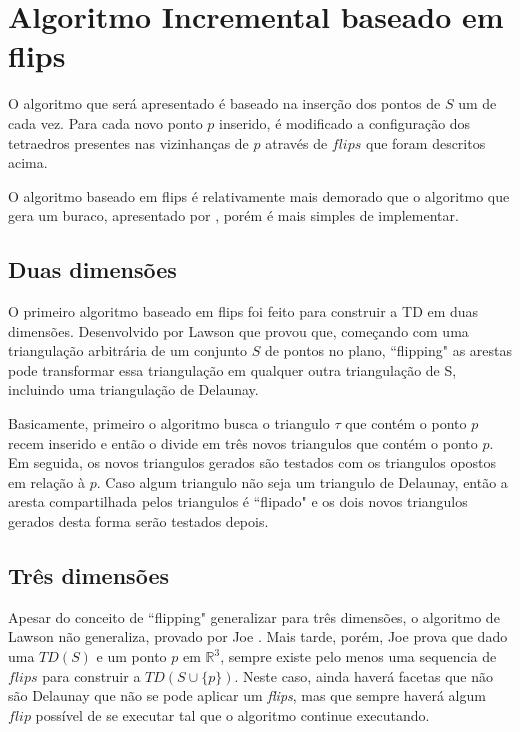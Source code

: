 

\section{Algoritmo Incremental baseado em flips}

O algoritmo que será apresentado é baseado na inserção dos pontos de $S$ um de cada vez.
Para cada novo ponto $p$ inserido, é modificado a configuração dos tetraedros presentes nas vizinhanças 
de $p$ através de $flips$ que foram descritos acima. 

O algoritmo baseado em flips é relativamente mais demorado que o algoritmo que 
gera um buraco, apresentado por \cite{Engwirda2015}, porém é mais simples de implementar.

\subsection{Duas dimensões}

O primeiro algoritmo baseado em flips foi feito para construir a TD em duas dimensões.
Desenvolvido por Lawson \cite{Lawson1977} que provou que, começando com uma 
triangulação arbitrária de um conjunto $S$ de pontos no plano, ``flipping" 
as arestas pode transformar essa triangulação em qualquer outra triangulação de S,
incluindo uma triangulação de Delaunay. 

Basicamente, primeiro o algoritmo busca o triangulo $\tau$ que contém o ponto
$p$ recem inserido e então o divide em três novos triangulos que contém o 
ponto $p$. Em seguida, os novos triangulos gerados são testados com os triangulos
opostos em relação à $p$. Caso algum triangulo não seja um triangulo de Delaunay,
então a aresta compartilhada pelos triangulos é ``flipado" e os dois novos triangulos
gerados desta forma serão testados depois. 

\subsection{Três dimensões}

Apesar do conceito de ``flipping" generalizar para três dimensões, o algoritmo 
de Lawson \cite{Lawson1977} não generaliza, provado por Joe \cite{Joe1989}.
Mais tarde, porém, Joe \cite{Joe1991} prova que dado uma $TD(S)$ e um ponto 
$p$ em $\mathbb{R}^3$, sempre existe pelo menos uma sequencia de $flips$ para 
construir a $TD(S \cup \{p\})$. Neste caso, ainda haverá facetas que não são
Delaunay que não se pode aplicar um \textit{flips}, mas que sempre haverá algum
$flip$ possível de se executar tal que o algoritmo continue executando.

